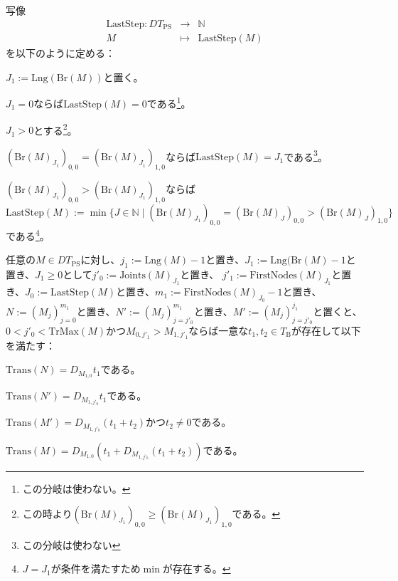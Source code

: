 \documentclass[dvipdfmx,uplatex]{jsarticle}
\theoremstyle{customnonumberbreakfortheorem}
\theoremstyle{customnonumberbreakforproof}
\begin{document}
写像
\begin{eqnarray*}
\textrm{LastStep} \colon DT_{\textrm{PS}} & \to & \mathbb{N} \\
M & \mapsto & \textrm{LastStep}(M)
\end{eqnarray*}
を以下のように定める：
\begin{nenumerate}
	\item \(J_1 := \textrm{Lng}(\textrm{Br}(M))\)と置く。
	\item \(J_1 = 0\)ならば\(\textrm{LastStep}(M) = 0\)である\footnote{この分岐は使わない。}。
	\item \(J_1 > 0\)とする\footnote{この時より\((\textrm{Br}(M)_{J_1})_{0,0} \geq (\textrm{Br}(M)_{J_1})_{1,0}\)である。}。
	\begin{nenumerate}
		\item \((\textrm{Br}(M)_{J_1})_{0,0} = (\textrm{Br}(M)_{J_1})_{1,0}\)ならば\(\textrm{LastStep}(M) = J_1\)である\footnote{この分岐は使わない}。
		\item \((\textrm{Br}(M)_{J_1})_{0,0} > (\textrm{Br}(M)_{J_1})_{1,0}\)ならば\(\textrm{LastStep}(M) := \min \{J \in \mathbb{N} \mid (\textrm{Br}(M)_{J_1})_{0,0} = (\textrm{Br}(M)_J)_{0,0} > (\textrm{Br}(M)_J)_{1,0}\}\)である\footnote{\(J = J_1\)が条件を満たすため\(\min\)が存在する。}。
	\end{nenumerate}
\end{nenumerate}

\begin{proposition}\label{条件(II)か(IV)の下での終切片とTransの関係}
	任意の\(M \in DT_{\textrm{PS}}\)に対し、\(j_1 := \textrm{Lng}(M)-1\)と置き、\(J_1 := \textrm{Lng}(\textrm{Br}(M)-1\)と置き、\(J_1 \geq 0\)として\(j'_0 := \textrm{Joints}(M)_{J_1}\)と置き、 \(j'_1 := \textrm{FirstNodes}(M)_{J_1}\)と置き、\(J_0 := \textrm{LastStep}(M)\)と置き、\(m_1 := \textrm{FirstNodes}(M)_{J_0}-1\)と置き、\(N := (M_j)_{j=0}^{m_1}\)と置き、\(N' := (M_j)_{j=j'_0}^{m_1}\)と置き\footnotemark{}、\(M' := (M_j)_{j=j'_0}^{j_1}\)と置くと、\(0 < j'_0 < \textrm{TrMax}(M)\)かつ\(M_{0,j'_1} > M_{1,j'_1}\)ならば一意な\(t_1,t_2 \in T_{\textrm{B}}\)が存在して以下を満たす：
	\begin{penumerate}
		\item \(\textrm{Trans}(N) = D_{M_{1,0}} t_1\)である。
		\item \(\textrm{Trans}(N') = D_{M_{1,j'_0}} t_1\)である。
		\item \(\textrm{Trans}(M') = D_{M_{1,j'_0}}(t_1 + t_2)\)かつ\(t_2 \neq 0\)である。
		\item \(\textrm{Trans}(M) = D_{M_{1,0}}(t_1 + D_{M_{1,j'_0}}(t_1 + t_2))\)である。
	\end{penumerate}
\end{proposition}
\end{document}
